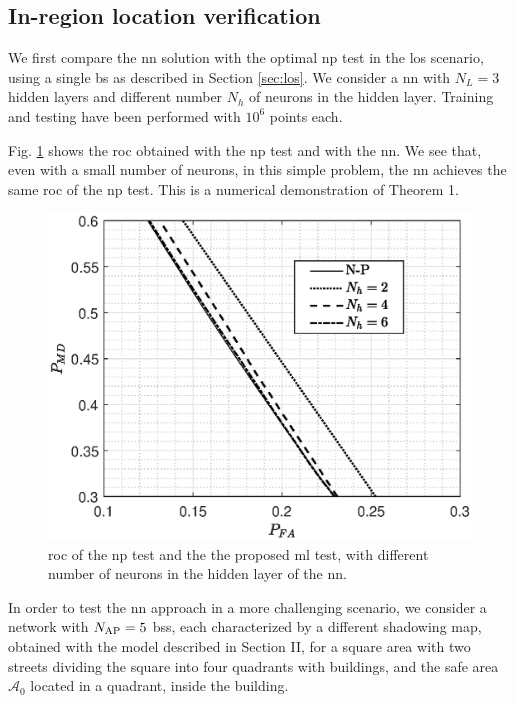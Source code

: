 \documentclass[conference,final]{IEEEtran}
\begin{document}
\subsection{In-region location verification}
We first compare the \ac{nn} solution with the optimal \ac{np} test in the \ac{los} scenario, using a single \ac{bs} as described in Section \ref{sec:los}. We consider a \ac{nn} with $N_L=3$ hidden layers and different number $N_h$ of neurons in the hidden layer. Training and testing have been performed with $10^6$ points each. 

Fig. \ref{fig:NP_comp} shows the \ac{roc} obtained with the \ac{np} test and with the \ac{nn}. We see that, even with a small number of neurons, in this simple problem, the \ac{nn} achieves the same \ac{roc} of the \ac{np} test. This is a numerical demonstration of Theorem 1.

 
 \begin{figure}[h]
     \centering
     \includegraphics[width=0.9\columnwidth]{FA_MD_LOS.eps}
     \caption{\ac{roc} of the \ac{np} test and the the proposed \ac{ml} test,  with different number of neurons in the hidden layer of the \ac{nn}.}
     \label{fig:NP_comp}
 \end{figure}

 
In order to test the \ac{nn} approach in a more challenging scenario, we consider a network with $N_{\rm AP}=5$ \acp{bs}, each  characterized by a different  shadowing map, obtained with the model described in Section II, for a square area with two streets dividing the square into four quadrants with buildings, and the safe area $\mathcal A_0$  located in a quadrant, inside the building.
\end{document}
